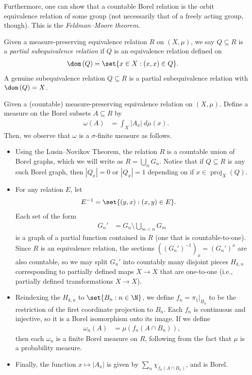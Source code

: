 \documentclass[10pt]{mypackage}
\begin{document}
Furthermore, one can show that a countable Borel relation is the orbit equivalence relation of some group (not necessarily that of a freely acting group, though). This is the \textit{Feldman--Moore theorem}.
\begin{definition}
  Given a measure-preserving equivalence relation $R$ on $\left( X,\mu \right)$, we say $Q\subseteq R$ is a \textit{partial subequivalence relation} if $Q$ is an equivalence relation defined on
  \begin{align*}
    \dom\left( Q \right) &= \set{x\in X : \left( x,x \right)\in Q}.
  \end{align*}
  A genuine subequivalence relation $Q\subseteq R$ is a partial subequivalence relation with $\dom\left( Q \right) = X$.
\end{definition}
Given a (countable) measure-preserving equivalence relation on $\left( X,\mu \right)$. Define a measure on the Borel subsets $A\subseteq R$ by
\begin{align*}
  \omega\left( A \right) &= \int_{X}^{} \left\vert A_x \right\vert\:d\mu(x).
\end{align*}
Then, we observe that $\omega$ is a $\sigma$-finite measure as follows.
\begin{itemize}
  \item Using the Lusin--Novikov Theorem, the relation $R$ is a countable union of Borel graphs, which we will write as $R = \bigcup_{n} G_n$. Notice that if $Q\subseteq R$ is any such Borel graph, then $\left\vert Q_x \right\vert = 0$ or $\left\vert Q_x \right\vert = 1$ depending on if $x\in \operatorname{proj}_X\left( Q \right)$.
  \item For any relation $E$, let
    \begin{align*}
      E^{-1} &= \set{\left( y,x \right) : \left( x,y \right)\in E}.
    \end{align*}
    Each set of the form
    \begin{align*}
      G_n' &= G_n\setminus \bigcup_{m < n}G_m
    \end{align*}
    is a graph of a partial function contained in $R$ (one that is countable-to-one). Since $R$ is an equivalence relation, the sections $\left( \left( G_n' \right)^{-1} \right)_{x} = \left( G_n' \right)^{x}$ are also countable, so we may split $G_n'$ into countably many disjoint pieces $H_{k,n}$ corresponding to partially defined maps $X\to X$ that are one-to-one (i.e., partially defined transformations $X\to X$). 
  \item Reindexing the $H_{k,n}$ to $\set{B_n : n\in \N}$, we define $f_n = \pi_1|_{B_n}$ to be the restriction of the first coordinate projection to $B_n$. Each $f_n$ is continuous and injective, so it is a Borel isomorphism onto its image. If we define
    \begin{align*}
      \omega_n(A) &= \mu\left( f_n\left( A\cap B_n \right) \right),
    \end{align*}
    then each $\omega_n$ is a finite Borel measure on $R$, following from the fact that $\mu$ is a probability measure.
  \item Finally, the function $x\mapsto \left\vert A_x \right\vert$ is given by $\sum_{n}\chi_{f_n\left( A\cap B_n \right)}$, and is Borel.
\end{itemize}
\end{document}
